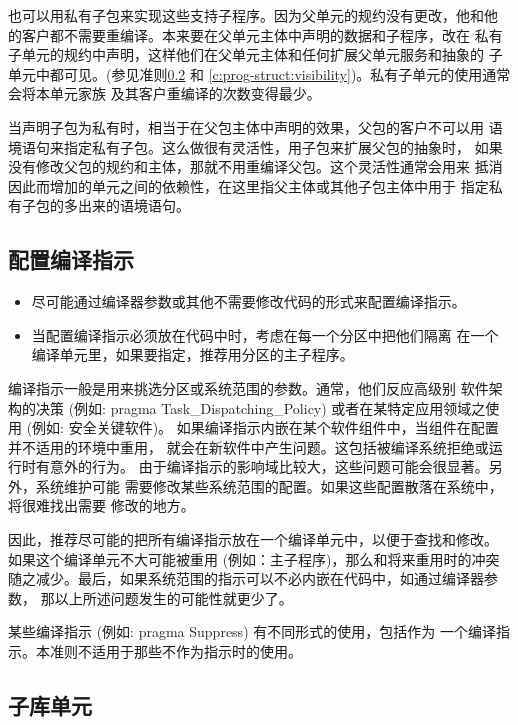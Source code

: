 \begin{blockindent}
也可以用私有子包来实现这些支持子程序。因为父单元的规约没有更改，他和他
的客户都不需要重编译。本来要在父单元主体中声明的数据和子程序，改在
私有子单元的规约中声明，这样他们在父单元主体和任何扩展父单元服务和抽象的
子单元中都可见。(参见准则\ref{c:prog-struct:high-level:child-lib-unit} 和
\ref{c:prog-struct:visibility})。私有子单元的使用通常会将本单元家族
及其客户重编译的次数变得最少。

当声明子包为私有时，相当于在父包主体中声明的效果，父包的客户不可以用
语境语句来指定私有子包。这么做很有灵活性，用子包来扩展父包的抽象时，
如果没有修改父包的规约和主体，那就不用重编译父包。这个灵活性通常会用来
抵消因此而增加的单元之间的依赖性，在这里指父主体或其他子包主体中用于
指定私有子包的多出来的语境语句。
\end{blockindent}

\subsection{配置编译指示}
\begin{itemize}
    \item 尽可能通过编译器参数或其他不需要修改代码的形式来配置编译指示。
    \item 当配置编译指示必须放在代码中时，考虑在每一个分区中把他们隔离
在一个编译单元里，如果要指定，推荐用分区的主子程序。
\end{itemize}

\begin{blockindent}
编译指示一般是用来挑选分区或系统范围的参数。通常，他们反应高级别
软件架构的决策 (例如: pragma Task\_Dispatching\_Policy)
或者在某特定应用领域之使用 (例如: 安全关键软件)。
如果编译指示内嵌在某个软件组件中，当组件在配置并不适用的环境中重用，
就会在新软件中产生问题。这包括被编译系统拒绝或运行时有意外的行为。
由于编译指示的影响域比较大，这些问题可能会很显著。另外，系统维护可能
需要修改某些系统范围的配置。如果这些配置散落在系统中，将很难找出需要
修改的地方。

因此，推荐尽可能的把所有编译指示放在一个编译单元中，以便于查找和修改。
如果这个编译单元不大可能被重用 (例如：主子程序)，那么和将来重用时的冲突
随之减少。最后，如果系统范围的指示可以不必内嵌在代码中，如通过编译器参数，
那以上所述问题发生的可能性就更少了。
\end{blockindent}

某些编译指示 (例如: pragma Suppress) 有不同形式的使用，包括作为
一个编译指示。本准则不适用于那些不作为指示时的使用。

\subsection{子库单元}

\label{c:prog-struct:high-level:child-lib-unit}
